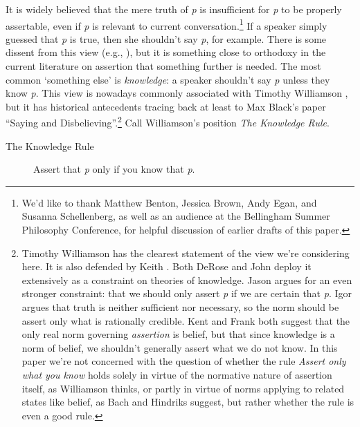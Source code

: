 It is widely believed that the mere truth of \textit{p} is insufficient for \textit{p} to be properly assertable, even if \textit{p} is relevant to current conversation.\footnote{We'd like to thank Matthew Benton, Jessica Brown, Andy Egan, and Susanna Schellenberg, as well as an audience at the Bellingham Summer Philosophy Conference, for helpful discussion of earlier drafts of this paper.} If a speaker simply guessed that \textit{p} is true, then she shouldn't say \textit{p}, for example. There is some dissent from this view (e.g., \citet{Weiner2005}), but it is something close to orthodoxy in the current literature on assertion that something further is needed. The most common `something else' is \textit{knowledge}: a speaker shouldn't say \textit{p} unless they know \textit{p}. This view is nowadays commonly associated with Timothy Williamson \citeyearpar{Williamson1996-WILKAA, Williamson2000-WILKAI}, but it has historical antecedents tracing back at least to Max Black's \citeyear{Black1952} paper ``Saying and Disbelieving''.\footnote{Timothy Williamson \citep[Ch. 11]{Williamson2000-WILKAI} has the clearest statement of the view we're considering here. It is also defended by Keith \citet{DeRose2002}. Both DeRose and John \citet{Hawthorne2004} deploy it extensively as a constraint on theories of knowledge. Jason \citet{Stanley2008-STAKAC}argues for an even stronger constraint: that we should only assert \textit{p} if we are certain that \textit{p}. Igor \citet{Douven2006} argues that truth is neither sufficient nor necessary, so the norm should be assert only what is rationally credible. Kent \citet{Bach2010} and Frank \citet{Hindriks2007} both suggest that the only real norm governing \textit{assertion} is belief, but that since knowledge is a norm of belief, we shouldn't generally assert what we do not know. In this paper we're not concerned with the question of whether the rule \textit{Assert only what you know} holds solely in virtue of the normative nature of assertion itself, as Williamson thinks, or partly in virtue of norms applying to related states like belief, as Bach and Hindriks suggest, but rather whether the rule is even a good rule.} Call Williamson's position \textit{The Knowledge Rule}.

\begin{description}
\item[The Knowledge Rule] Assert that \textit{p} only if you know that \textit{p}. 
\end{description}

